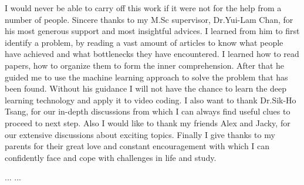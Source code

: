 \documentclass{report}
\begin{document}
    I would never be able to carry off this work if it were not for the help
    from a number of people.
    Sincere thanks to my M.Sc supervisor, Dr.Yui-Lam Chan, for his most
    generous support and most insightful advices.
    I learned from him to first identify a problem,
    by reading a vast amount of articles
    to know what people have achieved and what bottlenecks they have encountered.
    I learned how to read papers, how to organize them to
    form the inner comprehension.
    After that he guided me to use the machine learning approach to solve the
    problem that has been found.
    Without his guidance I will not have the chance to learn the deep
    learning technology and apply it to video coding.
    I also want to thank Dr.Sik-Ho Tsang, for our in-depth discussions from
    which I can always find useful clues to proceed to next step.
    Also I would like to thank my friends Alex and Jacky, for our
    extensive discussions about exciting topics.
    Finally I give thanks to my parents for their great love and constant
    encouragement with which I can confidently face and cope with challenges
    in life and study.
    \afterpreface

    
    
    ...
    ...
    \printbibliography[heading=bibintoc]
\end{document}

